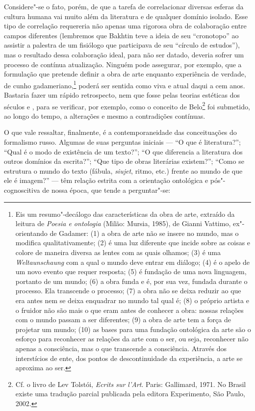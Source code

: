 Considere"-se o fato, porém, de que a tarefa de correlacionar diversas
esferas da cultura humana vai muito além da literatura e de qualquer
domínio isolado. Esse tipo de correlação requereria não apenas uma
rigorosa obra de colaboração entre campos diferentes (lembremos que Bakhtin teve a ideia de seu ``cronotopo'' ao
assistir a palestra de um fisiólogo que participava de seu ``círculo de
estudos''), mas o resultado dessa colaboração ideal, para não ser
datado, deveria sofrer um processo de contínua atualização. Ninguém pode
assegurar, por exemplo, que a formulação que pretende definir a obra de
arte enquanto experiência de verdade, de cunho
gadameriano,\footnote{Eis 
um resumo"-decálogo das características da obra de arte, extraído da 
leitura de \emph{Poesia e ontologia} (Milão: Mursia, 1985), de Gianni 
Vattimo, ex"-orientando de Gadamer: (1) a obra de arte não se insere 
no mundo, mas o modifica qualitativamente; (2) é uma luz diferente
 que incide sobre as coisas e colore de maneira diversa as lentes com 
as quais olhamos; (3) é uma \emph{Weltaunschaung} com a qual o mundo
 deve entrar em diálogo; (4) é o apelo de um novo evento que requer 
resposta; (5) é fundação de uma nova linguagem, portanto de um mundo; 
(6) a obra funda e é, por sua vez, fundada durante o processo. Ela
 transcende o processo; (7) a obra não se deixa reduzir ao que era 
antes nem se deixa enquadrar no mundo tal qual é;
(8) o próprio artista e o fruidor não são mais o que eram antes
 de conhecer a obra: nossas relações com o mundo passam a ser 
diferentes; (9) a obra de arte tem a força de projetar um mundo; (10)
 as bases para uma fundação ontológica da arte são o esforço para
 reconhecer as relações da arte com o ser, ou seja, reconhecer não 
apenas a consciência, mas o que transcende a consciência. Através dos 
interstícios de ente, dos pontos de descontinuidade da experiência, a 
arte se aproxima ao ser.} poderá ser sentida como viva e atual daqui 
a cem anos. Bastaria fazer um rápido retrospecto, nem que fosse pelas
 teorias estéticas dos séculos  e , para se 
verificar, por exemplo, como o conceito de Belo\footnote{Cf. o 
livro de Lev Tolstói, \emph{Ecrits sur l'Art}. Paris: Gallimard, 1971.
 No Brasil existe uma tradução parcial publicada pela editora 
Experimento, São Paulo, 2002.} foi submetido, ao longo do tempo, a 
alterações e mesmo a contradições contínuas.

O que vale ressaltar, finalmente, é a contemporaneidade das
conceituações do formalismo russo. Algumas de suas perguntas iniciais
--- ``O que é literatura?''; ``Qual é o modo de existência de um texto?'';
``O que diferencia a literatura dos outros domínios da escrita?''; ``Que
tipo de obras literárias existem?''; ``Como se estrutura o mundo do
texto (fábula, \emph{siujet}, ritmo, etc.) frente ao mundo de que ele é
imagem?'' --- têm relação estrita com a orientação ontológica e
pós"-cognoscitiva de nossa época, que tende a perguntar"-se:

